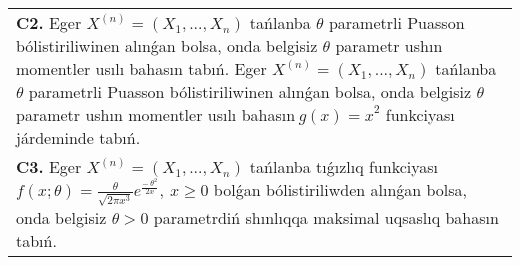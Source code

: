 \documentclass{article}
\begin{document}
\begin{tabular}{m{17cm}}
 \\
\textbf{C2.} 
Eger \(X^{(n)} = \left( X_{1},...,X_{n} \right)\) tańlanba \(\theta\) parametrli Puasson bólistiriliwinen alınǵan bolsa, onda belgisiz \(\theta\) parametr ushın momentler usılı bahasın tabıń. Eger \(X^{(n)} = \left( X_{1},...,X_{n} \right)\) tańlanba \(\theta\) parametrli Puasson bólistiriliwinen alınǵan bolsa, onda belgisiz \(\theta\) parametr ushın momentler usılı bahasın\({\ g(x) = x}^{2}\) funkciyası járdeminde tabıń.
 \\
\textbf{C3.} 
Eger \(X^{(n)} = \left( X_{1},...,X_{n} \right)\) tańlanba tıǵızlıq funkciyası
$f(x;\theta) = \frac{\theta}{\sqrt{2\pi x^{3}}}e^{\frac{- \ \theta^{2}}{2x}},\ x \geq 0$
bolǵan bólistiriliwden alınǵan bolsa, onda belgisiz \(\theta > 0\) parametrdiń shınlıqqa maksimal uqsaslıq bahasın tabıń.
 \\

\end{tabular}
\vspace{1cm}
\end{document}
